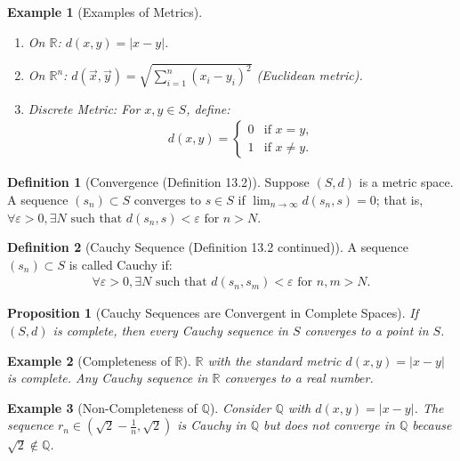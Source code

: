 \documentclass[7pt]{article}
\theoremstyle{definition}
\newtheorem{definition}{Definition}
\theoremstyle{plain}
\newtheorem{proposition}{Proposition}
\newtheorem{example}{Example}
\begin{document}
\begin{example}[Examples of Metrics]

\begin{enumerate}
    \item On $ \mathbb{R} $: $ d(x, y) = |x - y| $.
    \item On $ \mathbb{R}^n $: $ d(\vec{x}, \vec{y}) = \sqrt{\sum_{i=1}^n (x_i - y_i)^2} $ (Euclidean metric).
    \item Discrete Metric: For $ x, y \in S $, define:
    \begin{align}
    d(x, y) = 
    \begin{cases} 
    0 & \text{if } x = y, \\
    1 & \text{if } x \neq y.
    \end{cases}
    \end{align}
\end{enumerate}
\end{example}

\begin{definition}[Convergence (Definition 13.2)]
Suppose $ (S, d) $ is a metric space. A sequence $ (s_n) \subset S $ converges to $ s \in S $ if $ \lim_{n \to \infty} d(s_n, s) = 0 $; that is, $ \forall \varepsilon > 0, \exists N \text{ such that } d(s_n, s) < \varepsilon \text{ for } n > N $.
\end{definition}

\begin{definition}[Cauchy Sequence (Definition 13.2 continued)]
A sequence $ (s_n) \subset S $ is called Cauchy if:
\begin{align}
\forall \varepsilon > 0, \exists N \text{ such that } d(s_n, s_m) < \varepsilon \text{ for } n, m > N.
\end{align}
\end{definition}

\begin{proposition}[Cauchy Sequences are Convergent in Complete Spaces]
If $ (S, d) $ is complete, then every Cauchy sequence in $ S $ converges to a point in $ S $.
\end{proposition}

\begin{example}[Completeness of $ \mathbb{R} $]
$ \mathbb{R} $ with the standard metric $ d(x, y) = |x - y| $ is complete. Any Cauchy sequence in $ \mathbb{R} $ converges to a real number.
\end{example}

\begin{example}[Non-Completeness of $ \mathbb{Q} $]
Consider $ \mathbb{Q} $ with $ d(x, y) = |x - y| $. The sequence $ r_n \in (\sqrt{2} - \frac{1}{n}, \sqrt{2}) $ is Cauchy in $ \mathbb{Q} $ but does not converge in $ \mathbb{Q} $ because $ \sqrt{2} \notin \mathbb{Q} $.
\end{example}
\end{document}
